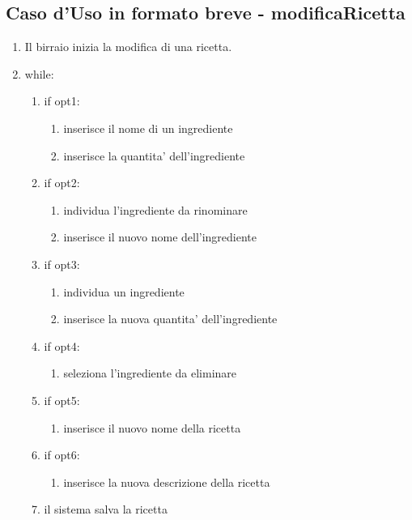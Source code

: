 \documentclass[a4paper,12pt]{report}
\begin{document}
		\subsection{Caso d'Uso in formato breve - modificaRicetta}	
			\begin{enumerate}
    				\item Il birraio inizia la modifica di una ricetta.
    				\item while:
				\begin{enumerate}
					\item  if opt1:
						\begin{enumerate}
							\item inserisce il nome di un ingrediente
							\item inserisce la quantita' dell'ingrediente
						\end{enumerate}		
					\item  if opt2:
						\begin{enumerate}
							\item individua l'ingrediente da rinominare
							\item inserisce il nuovo nome dell'ingrediente
						\end{enumerate}		
					\item  if opt3:
						\begin{enumerate}
							\item individua un ingrediente
							\item inserisce la nuova quantita' dell'ingrediente
						\end{enumerate}
 					\item  if opt4:
						\begin{enumerate}
  							\item seleziona l'ingrediente da eliminare
						\end{enumerate}	
 					\item  if opt5:
						\begin{enumerate}
  							\item inserisce il nuovo nome della ricetta
						\end{enumerate}
 					\item  if opt6:
						\begin{enumerate}
  							\item inserisce la nuova descrizione della ricetta
						\end{enumerate}	
    					\item il sistema salva la ricetta
				\end{enumerate}	
			\end{enumerate}
			
\end{document}
